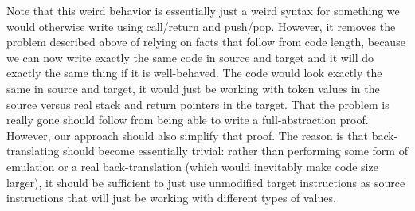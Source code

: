 \documentclass[a4paper]{article}
\begin{document}
Note that this weird behavior is essentially just a weird syntax for something we would otherwise write using call/return and push/pop.
However, it removes the problem described above of relying on facts that follow from code length, because we can now write exactly the same code in source and target and it will do exactly the same thing if it is well-behaved.
The code would look exactly the same in source and target, it would just be working with token values in the source versus real stack and return pointers in the target.
That the problem is really gone should follow from being able to write a full-abstraction proof.
However, our approach should also simplify that proof.
The reason is that back-translating should become essentially trivial: rather than performing some form of emulation or a real back-translation (which would inevitably make code size larger), it should be sufficient to just use unmodified target instructions as source instructions that will just be working with different types of values.
\end{document}
